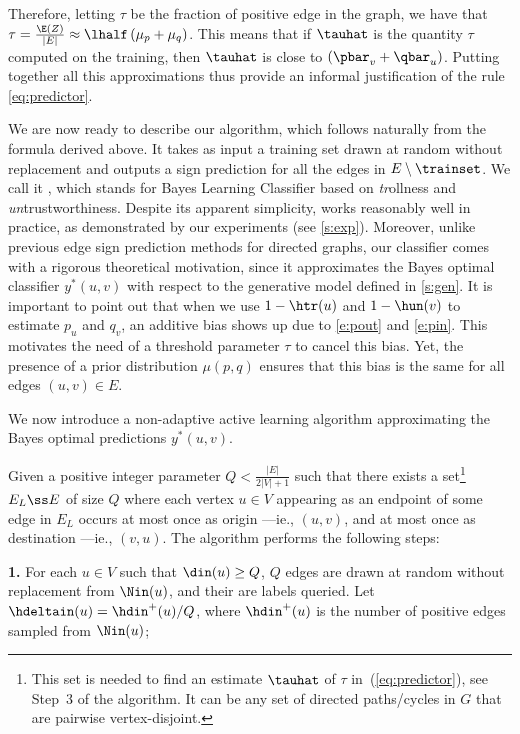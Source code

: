 Therefore, letting $\tau$ be the fraction of positive edge in the graph, we have that $\tau =
\frac{\E\left(Z \right)}{|E|} \approx \lhalf \left( \mu_p + \mu_q \right)$. This means that if
$\tauhat$ is the quantity $\tau$ computed on the training, then $\tauhat$ is close to $\left(
\pbar_v + \qbar_u \right)$. Putting together all this approximations thus provide an informal
justification of the rule \eqref{eq:predictor}.

We are now ready to describe our algorithm, which follows naturally from the formula derived above.
It takes as input a training set \trainset{} drawn at random without replacement and outputs a sign
prediction for all the edges in $E\setminus \trainset$. We call it \usrule{}, which stands for Bayes
Learning Classifier based on \emph{tr}ollness and \emph{un}trustworthiness.
\iffalse
Despite its apparent simplicity, \usrule{}
works reasonably well in practice, as demonstrated by our experiments (see \autoref{s:exp}).
Moreover, unlike previous edge sign prediction methods for directed graphs, our classifier comes
with a rigorous theoretical motivation, since it approximates the Bayes optimal classifier
$y^*(u,v)$ with respect to the generative model defined in \autoref{s:gen}. It is important to point
out that when we use $1-\htr(u)$ and $1-\hun(v)$ to estimate $p_u$ and $q_v$, an additive bias shows
up due to \eqref{e:pout} and \eqref{e:pin}. This motivates the need of a threshold parameter $\tau$
to cancel this bias. Yet, the presence of a prior distribution $\mu(p,q)$ ensures that this bias is
the same for all edges $(u,v) \in E$.


We now introduce a non-adaptive active learning algorithm approximating the Bayes optimal
predictions $y^*(u,v)$.

Given a positive integer parameter $Q < \tfrac{|E|}{2|V|+1}$ such that there exists a
set\footnote{This set is needed to find an estimate $\tauhat$ of $\tau$ in~(\ref{eq:predictor}), see
Step~3 of the algorithm. It can be any set of directed paths/cycles in $G$ that are pairwise
vertex-disjoint.} $E_L \ss E$ of size $Q$ where each vertex $u \in V$ appearing as an endpoint of
some edge in $E_L$ occurs at most once as origin ---ie{}., $(u,v)$, and at most once as destination
---ie{}., $(v,u)$. The algorithm performs the following steps:

\textbf{1.} For each $u \in V$ such that $\din(u) \ge Q$, $Q$ edges are drawn at random without
replacement from $\Nin(u)$, and their are labels queried. Let $\hdeltain(u) = \hdin^+(u)/Q$, where
$\hdin^+(u)$ is the number of positive edges sampled from $\Nin(u)$;


